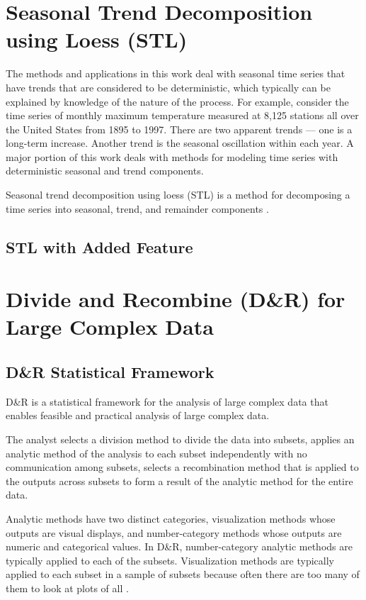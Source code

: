 \section{Seasonal Trend Decomposition using Loess (STL)}

The methods and applications in this work deal with seasonal time series
that have trends that are considered to be deterministic, which typically can be
explained by knowledge of the nature of the process. For example, consider the
time series of monthly maximum temperature measured at 8,125 stations all over 
the United States from 1895 to 1997. There are two apparent trends --- one is a
long-term increase. Another trend is the seasonal oscillation within each year.
A major portion of this work deals with methods for modeling time series with
deterministic seasonal and trend components.

Seasonal trend decomposition using loess (STL) is a method for decomposing a time
series into seasonal, trend, and remainder components \cite{Cleveland:1990}.

\subsection{STL with Added Feature}

\section{Divide and Recombine (D\&R) for Large Complex Data}

\subsection{D\&R Statistical Framework}

D\&R \cite{Guha:2012} is a statistical framework for the analysis of large complex
data that enables feasible and practical analysis of large complex data. 

The 
analyst selects a division method to divide the data into subsets, applies an 
analytic method of the analysis to each subset independently with no communication
among subsets, selects a recombination method that is applied to the outputs 
across subsets to form a result of the analytic method for the entire data.

Analytic methods have two distinct categories, visualization methods whose outputs
are visual displays, and number-category methods whose outputs are numeric and 
categorical values. In D\&R, number-category analytic methods are typically applied
to each of the subsets. Visualization methods are typically applied to each subset 
in a sample of subsets because often there are too many of them to look at plots 
of all \cite{Hafen:2013}.
 
